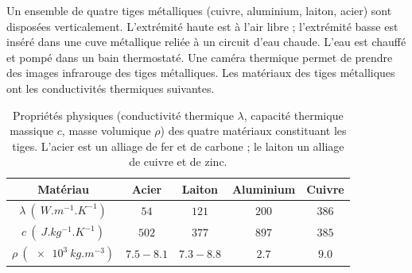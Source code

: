 

Un ensemble de quatre tiges métalliques (cuivre, aluminium, laiton, acier) sont disposées verticalement. L'extrémité haute est à l'air libre ; l'extrémité basse est inséré dans une cuve métallique reliée à un circuit d'eau chaude. L'eau est chauffé et pompé dans un bain thermostaté. Une caméra thermique permet de prendre des images infrarouge des tiges métalliques. Les matériaux des tiges métalliques ont les conductivités thermiques suivantes.

\begin{table}[h!]
\centering
\renewcommand{\arraystretch}{1.2}
\begin{tabular}{|c|c|c|c|c|}
\hline
Matériau & Acier & Laiton & Aluminium & Cuivre \\
\hline
$\lambda~(\SI{}{W.m^{-1}.K^{-1}})$ & $54$ & $121$ & $200$ & $386$ \\
\hline
$c~(\SI{}{J.kg^{-1}.K^{-1}})$ & $502$ & $377$ & $897$ & $385$ \\
\hline
$\rho~(\SI{e3}{kg.m^{-3}})$ & $\num{7.5}-\num{8.1}$ & $\num{7.3}-\num{8.8}$ & $\num{2.7}$ & $\num{9.0}$ \\
\hline
\end{tabular}
\caption{Propriétés physiques (conductivité thermique $\lambda$, capacité thermique massique $c$, masse volumique $\rho$) des quatre matériaux constituant les tiges. L’acier est un alliage de fer et de carbone ; le laiton un alliage de cuivre et de zinc.}
\label{tab:donnees}
\end{table}



